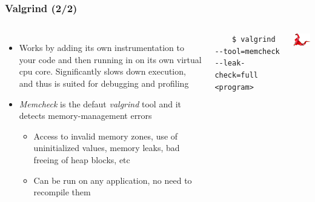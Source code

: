 \begin{frame}[fragile]
  \frametitle{Valgrind (2/2)}
  \begin{columns}[T]
    \begin{itemize}
      \item Works by adding its own instrumentation to your code and
            then running in on its own virtual cpu core. Significantly slows
            down execution, and thus is suited for debugging and profiling
      \item {\em Memcheck} is the defaut {\em valgrind} tool and it detects
            memory-management errors
      \begin{itemize}
        \item Access to invalid memory zones, use of uninitialized values,
              memory leaks, bad freeing of heap blocks, etc
        \item Can be run on any application, no need to recompile them
      \end{itemize}
    \end{itemize}
      \begin{block}{}
        \begin{verbatim}
    $ valgrind --tool=memcheck --leak-check=full <program>
        \end{verbatim}
      \end{block}
    \includegraphics[width=\textwidth]{../common/valgrind2.png}
  \end{columns}
\end{frame}

